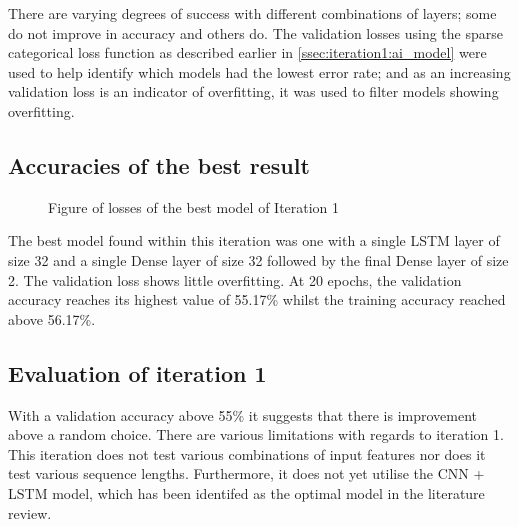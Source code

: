 There are varying degrees of success with different combinations of layers; some do not improve in accuracy and others do.
The validation losses using the sparse categorical loss function as described earlier in \autoref{ssec:iteration1:ai_model}
were used to help identify which models had the lowest error rate; and as an increasing validation
loss is an indicator of overfitting, it was used to filter models showing overfitting.

\subsection{Accuracies of the best result}
\begin{figure}[ht]
    \centering
    \qquad
    \caption[Figure of losses of the best model for Iteration 1]{Figure of losses of the best model of Iteration 1}
    \label{fig:iteration1_best_loss}
\end{figure}
\FloatBarrier
The best model found within this iteration was one with a single LSTM layer of size 32 and a single Dense layer of size 32 followed
by the final Dense layer of size 2. The validation loss shows little overfitting. At 20 epochs, the validation accuracy
reaches its highest value of 55.17\% whilst the training accuracy reached above 56.17\%.
\subsection{Evaluation of iteration 1}
With a validation accuracy above 55\% it suggests that there is improvement above a random choice.
There are various limitations with regards to iteration 1. This iteration does not test various combinations of input features nor does
it test various sequence lengths. Furthermore, it does not yet utilise the CNN + LSTM model, which has been identifed as the optimal model
in the literature review.

